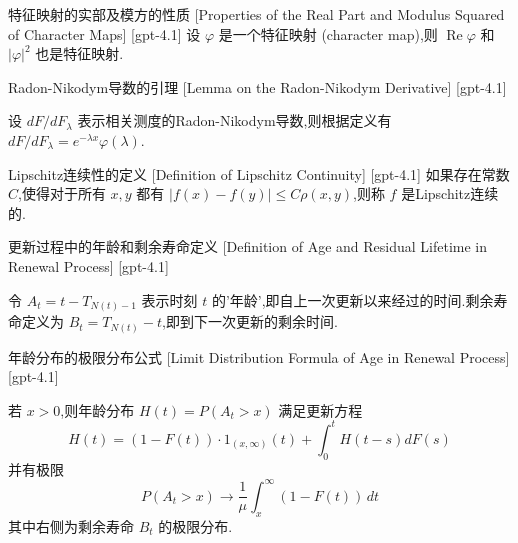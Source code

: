 \documentclass[UTF8]{ctexart}
\begin{document}
    
    
    \begin{thm}
        {特征映射的实部及模方的性质}
        [Properties of the Real Part and Modulus Squared of Character Maps]
        [gpt-4.1]
        设 $\varphi$ 是一个特征映射 (character map),则 $\operatorname{Re} \varphi$ 和 $|\varphi|^2$ 也是特征映射.
    \end{thm}
    
    
    
    \begin{lma}
        {Radon-Nikodym导数的引理}
        [Lemma on the Radon-Nikodym Derivative]
        [gpt-4.1]
        
设 $dF / dF_{ \lambda }$ 表示相关测度的Radon-Nikodym导数,则根据定义有 $dF / dF_{ \lambda } = e^{ - \lambda x } \varphi( \lambda )$.

    \end{lma}
    
    
    
    \begin{dfn}
        {Lipschitz连续性的定义}
        [Definition of Lipschitz Continuity]
        [gpt-4.1]
        如果存在常数 $C$,使得对于所有 $x, y$ 都有 $|f(x) - f(y)| \leq C \rho(x, y)$,则称 $f$ 是Lipschitz连续的.
    \end{dfn}
    
    
    
    \begin{dfn}
        {更新过程中的年龄和剩余寿命定义}
        [Definition of Age and Residual Lifetime in Renewal Process]
        [gpt-4.1]
        
令 $A_{t} = t - T_{N(t) - 1}$ 表示时刻 $t$ 的'年龄',即自上一次更新以来经过的时间.剩余寿命定义为 $B_{t} = T_{N(t)} - t$,即到下一次更新的剩余时间.

    \end{dfn}
    
    
    
    \begin{thm}
        {年龄分布的极限分布公式}
        [Limit Distribution Formula of Age in Renewal Process]
        [gpt-4.1]
        
若 $x>0$,则年龄分布 $H(t) = P(A_{t} > x)$ 满足更新方程
\[
H(t) = (1 - F(t))\cdot 1_{(x, \infty)}(t) + \int_{0}^{t} H(t - s) dF(s)
\]
并有极限
\[
P(A_{t} > x) \to \frac{1}{\mu} \int_{x}^{\infty} (1 - F(t))\, dt
\]
其中右侧为剩余寿命 $B_{t}$ 的极限分布.

    \end{thm}
    
\end{document}
